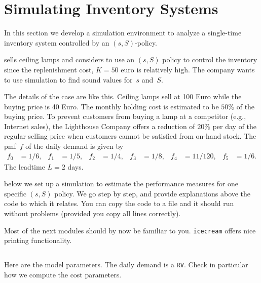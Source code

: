 \documentclass[stochastic-or.tex]{subfiles}
\begin{document}
\section{Simulating Inventory Systems}
\label{sec:simul-invent-syst}

In this section we develop a simulation environment to analyze a single-time inventory system controlled by an $(s,S)$-policy.

 sells ceiling lamps and considers to use an $(s,S)$ policy to control the inventory since the replenishment cost, $K=50$ euro is relatively high. The company wants to use simulation to find sound values for~$s$  and~$S$.

The details of the case are like this.
Ceiling lamps sell at 100 Euro while the buying price is 40 Euro.
The monthly holding cost is estimated to be $50\%$ of the buying price.
To prevent customers from buying a lamp at a competitor (e.g., Internet sales), the Lighthouse Company offers a reduction of $20\%$ per day of the regular selling price when customers cannot be satisfied from on-hand stock.
The pmf~$f$ of the daily demand is given by
  \begin{align*}
    f_{0} &= 1/6, &   f_{1} &= 1/5, &  f_{2}&= 1/4, &
    f_{3} &= 1/8, &  f_{4} &= 11/120, &  f_{5} &= 1/6.
  \end{align*}
The leadtime $L=2$ days.

 below we set up a simulation to estimate the performance measures for one specific $(s,S)$ policy.
We go step by step, and provide explanations above the code to which it relates.
You can copy the code to a file and it should run without problems (provided you copy all lines correctly).



Most of the next modules should by now be familiar to you. \texttt{icecream} offers nice printing functionality.
\inputminted[firstline=2, lastline=6]{python}{../code/ss_inventory_simulation.py} %



Here are the model parameters.
The daily demand is a \texttt{RV}.
Check in particular how we compute the cost parameters.

\inputminted[firstline=12, lastline=19]{python}{../code/ss_inventory_simulation.py} %
\end{document}
